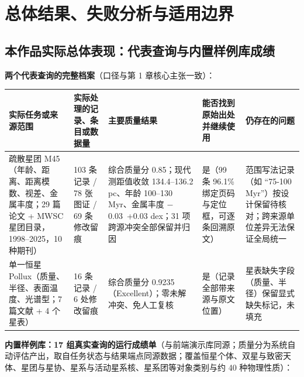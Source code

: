 \section{总体结果、失败分析与适用边界}

\subsection{本作品实际总体表现：代表查询与内置样例库成绩}

\noindent\textbf{两个代表查询的完整档案}（口径与第 1 章核心主张一致）：

\begin{longtable}{@{}p{3.2cm}p{2.6cm}p{3.6cm}p{2.6cm}p{2.4cm}@{}}
\toprule
实际任务或来源范围 & 实际处理的记录、条目或数据量 & 主要质量结果 & 能否找到原始出处并继续使用 & 仍存在的问题 \\
\midrule
疏散星团 M45（年龄、距离、距离模数、视差、金属丰度；29 篇论文 + MWSC 星团目录，1998--2025，10 种期刊） & 103 条记录 / 78 张图证 / 69 条修改留痕 & 综合质量分 0.85；现代测距值收敛 134.4--136.2 pc、年龄 100--130 Myr、金属丰度 $-$0.03~+0.03 dex；31 项跨源冲突全部保留并归因 & 是（99 条 96.1\% 绑定页码与定位框，可逐条回溯原文） & 范围写法记录（如 “75-100 Myr”）按设计保留待核对；跨来源单位差异无法保证全局统一 \\
单一恒星 Pollux（质量、半径、表面温度、光谱型；7 篇文献 + 4 个星表） & 16 条记录 / 6 处修改留痕 & 综合质量分 0.9235（Excellent）；零未解冲突、免人工复核 & 是（记录全部带来源与原文位置） & 星表缺失字段（质量、半径）保留显式缺失标记，未填充 \\
\bottomrule
\end{longtable}

\noindent\textbf{内置样例库：17 组真实查询的运行成绩单}（与前端演示库同源；质量分为系统自动评估产出，取自任务状态与结果端点同源数据；覆盖恒星个体、双星与致密天体、星团与星协、星系与活动星系核、星系团等对象类别与约 40 种物理性质）：

